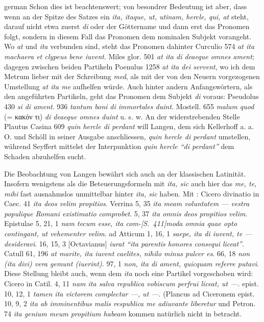 \begin{otherlanguage*}{german}
Schon dies ist beachtenswert; von besondrer Bedeutung ist aber, dass wenn an der Spitze des Satzes ein \emph{ita, itaque, ut, utinam, hercle, qui, at} steht, darauf nicht etwa zuerst \emph{di} oder der Göttername und dann erst das Pronomen folgt, sondern in diesem Fall das Pronomen dem nominalen Subjekt vorangeht. Wo \emph{at} und \emph{ita} verbunden sind, steht das Pronomen dahinter Curculio 574 \emph{at ita  machaera et clypeus bene iuvent}. Miles glor. 501 \emph{at ita  di deaeque omnes ament}; dagegen zwischen beiden Partikeln Poenulus 1258 \emph{at  ita dei servent}, wo ich dem Metrum lieber mit der Schreibung \emph{med}, als mit der von den Neuern vorgezogenen Umstellung \emph{at ita me} aufhelfen würde. Auch hinter andern Anfangswörtern, als den angeführten Partikeln, geht das Pronomen dem Subjekt \emph{di} voraus: Pseudolus 430 \emph{si  di ament}. 936 \emph{tantum  boni di immortales duint}. Mostell. 655 \emph{malum quod} (= κακόν τι) \emph{ di deaeque omnes duint} u. s. w. An der widerstrebenden Stelle Plautus Casina 609 \emph{quin hercle di  perdant} will Langen, dem sich Kellerhoff a. a. O. und Schöll in seiner Ausgabe anschliessen, \emph{quin hercle  di perdant} umstellen, während Seyffert mittelst der Interpunktion \emph{quin hercle “di  perdant”} dem Schaden abzuhelfen sucht.

Die Beobachtung von Langen bewährt sich auch an der klassischen Latinität. Insofern wenigstens als die Beteuerungsformeln mit \emph{ita, sic} auch hier das \emph{me, te, mihi} fast ausnahmslos unmittelbar hinter \emph{ita, sic} haben. Mit \emph{}: Cicero divinatio in Caec. 41 \emph{ita  deos velim propitios}. Verrina 5, 35 \emph{ita  meam voluntatem — vestra populique Romani existimatio comprobet}. 5, 37 \emph{ita  omnis deos propitios velim}. Epistulae 5, 21, 1 \emph{nam tecum esse, ita  com-}\hypertarget{p411}{\emph{[S.~411]}}\label{p411}\emph{moda omnia quae opto contingant, ut vehementer velim}. ad Atticum 1, 16, 1 \emph{saepe, ita  di iuvent, te — desideravi}. 16, 15, 3 [Octavianus] \emph{iurat “ita  parentis honores consequi liceat”}. Catull 61, 196 \emph{at marite, ita  iuvent caelites, nihilo minus pulcer es}. 66, 18 \emph{non (ita  divi) vera gemunt (iuerint)}. 97, 1 \emph{non, ita  di ament, quicquam referre putavi}. Diese Stellung bleibt auch, wenn dem \emph{ita} noch eine Partikel vorgeschoben wird: Cicero in Catil. 4, 11 \emph{nam ita  salva republica vobiscum perfrui liceat, ut —}. epist. 10, 12, 1 \emph{tamen ita  victorem complectar —, ut —}. (Plancus ad Ciceronem epist. 10, 9, 2 \emph{ita ab imminentibus malis respublica me adiuvante liberetur} und Petron. 74 \emph{ita genium meum propitium habeam} kommen natürlich nicht in betracht.


\end{otherlanguage*}
